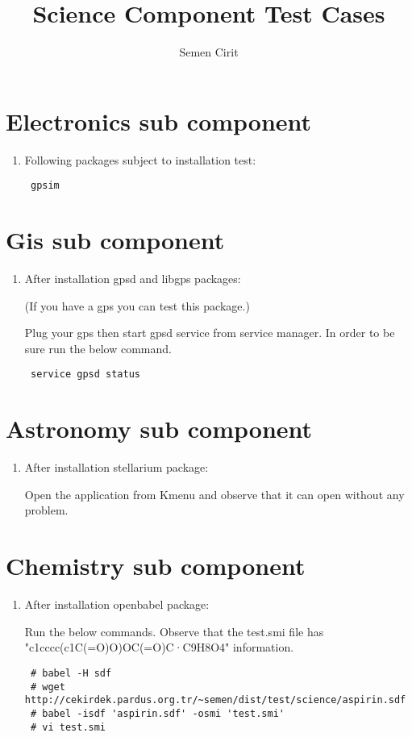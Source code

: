 \documentclass[a4paper,10pt]{article}
\title{Science Component Test Cases}
\author{Semen Cirit}
\begin{document}
\maketitle
\section{Electronics sub component}
\begin{enumerate}
 \item Following packages subject to installation test:
\begin{verbatim}
 gpsim
\end{verbatim}

\end{enumerate}


\section{Gis sub component}
\begin{enumerate}
 \item After installation gpsd and libgps packages:

(If you have a gps you can test this package.)

Plug your gps then start gpsd service from service manager. In order to be sure run the below command.
\begin{verbatim}
 service gpsd status
\end{verbatim}


\end{enumerate}


\section{Astronomy sub component}
\begin{enumerate}
 \item After installation stellarium package:

Open the application from Kmenu and observe that it can open without any problem.
\end{enumerate}

\section{Chemistry sub component}
\begin{enumerate}
 \item After installation openbabel package:

Run the below commands. Observe that the test.smi file has "c1cccc(c1C(=O)O)OC(=O)C·C9H8O4" information.
\begin{verbatim}
 # babel -H sdf
 # wget http://cekirdek.pardus.org.tr/~semen/dist/test/science/aspirin.sdf
 # babel -isdf 'aspirin.sdf' -osmi 'test.smi'
 # vi test.smi
\end{verbatim}

\end{enumerate}
\end{document}
